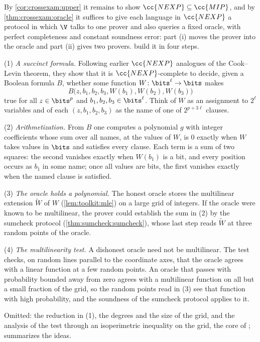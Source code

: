 \begin{refsection}
\begin{proofsketch}
By \cref{cor:crossexam:upper} it remains to show $\cc{NEXP}\subseteq\cc{MIP}$, and by \cref{thm:crossexam:oracle} it suffices to give each language in $\cc{NEXP}$ a protocol in which $\V$ talks to one prover and also queries a fixed oracle, with perfect completeness and constant soundness error: part (i) moves the prover into the oracle and part (ii) gives two provers. \Textcite{BabaiFortnowLund1991} build it in four steps.

(1) \emph{A succinct formula.} Following earlier $\cc{NEXP}$ analogues of the Cook--Levin theorem, they show that it is $\cc{NEXP}$-complete to decide, given a Boolean formula $B$, whether some function $W\colon\bits^\ell\to\bits$ makes
\[
  B\bigl(z,b_1,b_2,b_3,W(b_1),W(b_2),W(b_3)\bigr)
\]
true for all $z\in\bits^{p}$ and $b_1,b_2,b_3\in\bits^\ell$. Think of $W$ as an assignment to $2^\ell$ variables and of each $(z,b_1,b_2,b_3)$ as the name of one of $2^{p+3\ell}$ clauses.

(2) \emph{Arithmetization.} From $B$ one computes a polynomial $g$ with integer coefficients whose sum over all names, at the values of $W$, is $0$ exactly when $W$ takes values in $\bits$ and satisfies every clause. Each term is a sum of two squares: the second vanishes exactly when $W(b_1)$ is a bit, and every position occurs as $b_1$ in some name; once all values are bits, the first vanishes exactly when the named clause is satisfied.

(3) \emph{The oracle holds a polynomial.} The honest oracle stores the multilinear extension $\tilde W$ of $W$ (\cref{lem:toolkit:mle}) on a large grid of integers. If the oracle were known to be multilinear, the prover could establish the sum in (2) by the sumcheck protocol (\cref{thm:sumcheck:sumcheck}), whose last step reads $\tilde W$ at three random points of the oracle.

(4) \emph{The multilinearity test.} A dishonest oracle need not be multilinear. The test checks, on random lines parallel to the coordinate axes, that the oracle agrees with a linear function at a few random points. An oracle that passes with probability bounded away from zero agrees with a multilinear function on all but a small fraction of the grid, so the random points read in (3) see that function with high probability, and the soundness of the sumcheck protocol applies to it.

Omitted: the reduction in (1), the degrees and the size of the grid, and the analysis of the test through an isoperimetric inequality on the grid, the core of \textcite[Section~5]{BabaiFortnowLund1991}; \textcite{Babai1990} summarizes the ideas.
\end{proofsketch}


\end{refsection}
